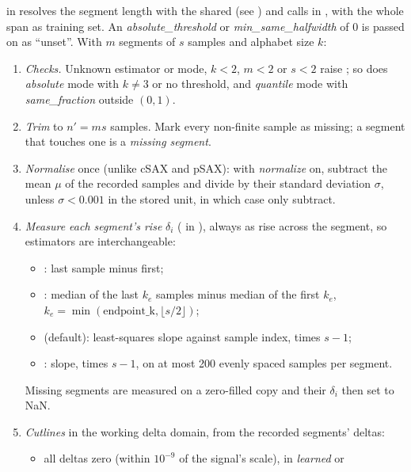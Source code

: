  in  resolves the segment length with the
shared  (see ) and calls  in
, with the whole span as training set. An
\emph{absolute\_threshold} or \emph{min\_same\_halfwidth} of 0 is passed on as ``unset''.
With $m$ segments of $s$ samples and alphabet size $k$:
\begin{enumerate}
\item \emph{Checks.} Unknown estimator or mode, $k<2$, $m<2$ or $s<2$ raise
  ; so does \emph{absolute} mode with $k\neq 3$ or no threshold, and
  \emph{quantile} mode with \emph{same\_fraction} outside $(0,1)$.
\item \emph{Trim} to $n' = ms$ samples. Mark every non-finite sample as missing; a segment
  that touches one is a \emph{missing segment}.
\item \emph{Normalise} once (unlike cSAX and pSAX): with \emph{normalize} on, subtract the
  mean $\mu$ of the recorded samples and divide by their standard deviation $\sigma$, unless
  $\sigma < 0.001$ in the stored unit, in which case only subtract.
\item \emph{Measure each segment's rise} $\delta_i$ ( in
  ), always as rise across the segment, so estimators are
  interchangeable:
  \begin{itemize}
  \item {}: last sample minus first;
  \item {}: median of the last $k_e$ samples minus median of the first
    $k_e$, $k_e = \min(\text{endpoint\_k}, \lfloor s/2\rfloor)$;
  \item {} (default): least-squares slope against sample index, times $s-1$;
  \item {}:  slope, times $s-1$, on at most 200
    evenly spaced samples per segment.
  \end{itemize}
  Missing segments are measured on a zero-filled copy and their $\delta_i$ then set to NaN.
\item \emph{Cutlines} in the working delta domain, from the recorded segments' deltas:
  \begin{itemize}
  \item all deltas zero (within $10^{-9}$ of the signal's scale), in \emph{learned} or

\end{itemize}
\end{enumerate}
